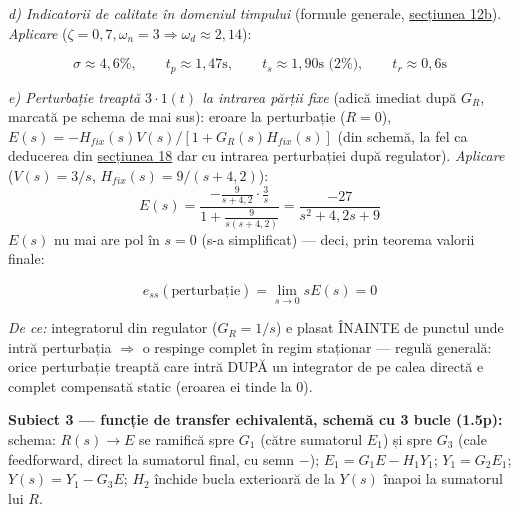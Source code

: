 \documentclass[10pt,a4paper]{article}
\begin{document}
\textit{d) Indicatorii de calitate în domeniul timpului} (formule generale, \hyperref[sec:12b]{secțiunea 12b}). \textit{Aplicare} ($\zeta{=}0{,}7,\omega_n{=}3\Rightarrow\omega_d{\approx}2{,}14$):
\begin{keyeq}\color{red!65!black}
$$\sigma\approx4{,}6\%,\qquad t_p\approx1{,}47\text{s},\qquad t_s\approx1{,}90\text{s (2\%)},\qquad t_r\approx0{,}6\text{s}$$
\end{keyeq}
\begin{center}
\end{center}

\textit{e) Perturbație treaptă $3{\cdot}1(t)$ la intrarea părții fixe} (adică imediat după $G_R$, marcată pe schema de mai sus): eroare la perturbație ($R{=}0$), $E(s){=}{-}H_{fix}(s)V(s)/[1{+}G_R(s)H_{fix}(s)]$ (din schemă, la fel ca deducerea din \hyperref[sec:18]{secțiunea 18} dar cu intrarea perturbației după regulator). \textit{Aplicare} ($V(s){=}3/s$, $H_{fix}(s){=}9/(s{+}4{,}2)$):
$$E(s)=\dfrac{-\frac9{s+4{,}2}\cdot\frac3s}{1+\frac9{s(s+4{,}2)}}=\dfrac{-27}{s^2+4{,}2s+9}$$
$E(s)$ nu mai are pol în $s{=}0$ (s-a simplificat) — deci, prin teorema valorii finale:
\begin{keyeq}\color{red!65!black}
$$e_{ss}(\text{perturbație})=\lim_{s\to0}sE(s)=0$$
\end{keyeq}
\textit{De ce:} integratorul din regulator ($G_R{=}1/s$) e plasat ÎNAINTE de punctul unde intră perturbația $\Rightarrow$ o respinge complet în regim staționar — regulă generală: orice perturbație treaptă care intră DUPĂ un integrator de pe calea directă e complet compensată static (eroarea ei tinde la $0$).

\textbf{Subiect 3 — funcție de transfer echivalentă, schemă cu 3 bucle (1.5p):} schema: $R(s)\to E$ se ramifică spre $G_1$ (către sumatorul $E_1$) și spre $G_3$ (cale feedforward, direct la sumatorul final, cu semn $-$); $E_1{=}G_1E-H_1Y_1$; $Y_1{=}G_2E_1$; $Y(s){=}Y_1-G_3E$; $H_2$ închide bucla exterioară de la $Y(s)$ înapoi la sumatorul lui $R$.
\end{document}

